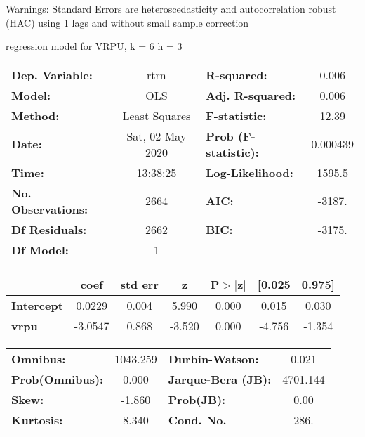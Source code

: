 Warnings: \newline
 [1] Standard Errors are heteroscedasticity and autocorrelation robust (HAC) using 1 lags and without small sample correction\ 

regression model for VRPU, k = 6 h = 3\begin{center}
\begin{tabular}{lclc}
\toprule
\textbf{Dep. Variable:}    &       rtrn       & \textbf{  R-squared:         } &     0.006   \\
\textbf{Model:}            &       OLS        & \textbf{  Adj. R-squared:    } &     0.006   \\
\textbf{Method:}           &  Least Squares   & \textbf{  F-statistic:       } &     12.39   \\
\textbf{Date:}             & Sat, 02 May 2020 & \textbf{  Prob (F-statistic):} &  0.000439   \\
\textbf{Time:}             &     13:38:25     & \textbf{  Log-Likelihood:    } &    1595.5   \\
\textbf{No. Observations:} &        2664      & \textbf{  AIC:               } &    -3187.   \\
\textbf{Df Residuals:}     &        2662      & \textbf{  BIC:               } &    -3175.   \\
\textbf{Df Model:}         &           1      & \textbf{                     } &             \\
\bottomrule
\end{tabular}
\begin{tabular}{lcccccc}
                   & \textbf{coef} & \textbf{std err} & \textbf{z} & \textbf{P$> |$z$|$} & \textbf{[0.025} & \textbf{0.975]}  \\
\midrule
\textbf{Intercept} &       0.0229  &        0.004     &     5.990  &         0.000        &        0.015    &        0.030     \\
\textbf{vrpu}      &      -3.0547  &        0.868     &    -3.520  &         0.000        &       -4.756    &       -1.354     \\
\bottomrule
\end{tabular}
\begin{tabular}{lclc}
\textbf{Omnibus:}       & 1043.259 & \textbf{  Durbin-Watson:     } &    0.021  \\
\textbf{Prob(Omnibus):} &   0.000  & \textbf{  Jarque-Bera (JB):  } & 4701.144  \\
\textbf{Skew:}          &  -1.860  & \textbf{  Prob(JB):          } &     0.00  \\
\textbf{Kurtosis:}      &   8.340  & \textbf{  Cond. No.          } &     286.  \\
\bottomrule
\end{tabular}
\end{center}


